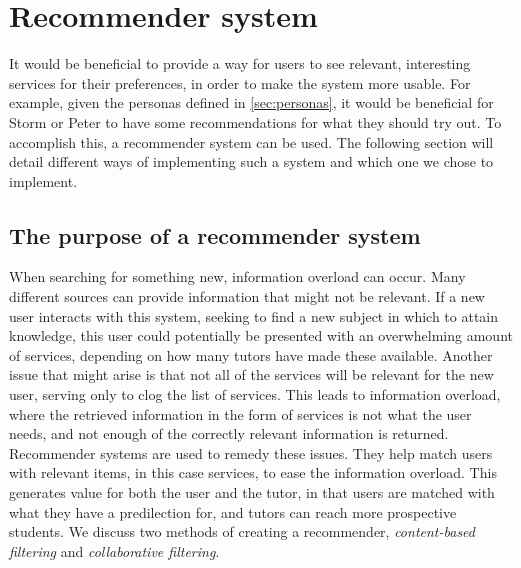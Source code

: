 \section{Recommender system}\label{Recommender-system}
It would be beneficial to provide a way for users to see relevant, interesting services for their preferences, in order to make the system more usable.
For example, given the personas defined in \autoref{sec:personas}, it would be beneficial for Storm or Peter to have some recommendations for what they should try out.
To accomplish this, a recommender system can be used.
The following section will detail different ways of implementing such a system and which one we chose to implement.

\subsection{The purpose of a recommender system}
When searching for something new, information overload can occur.
Many different sources can provide information that might not be relevant.
If a new user interacts with this system, seeking to find a new subject in which to attain knowledge, this user could potentially be presented with an overwhelming amount of services, depending on how many tutors have made these available.
Another issue that might arise is that not all of the services will be relevant for the new user, serving only to clog the list of services. 
This leads to information overload, where the retrieved information in the form of services is not what the user needs, and not enough of the correctly relevant information is returned.
Recommender systems are used to remedy these issues.
They help match users with relevant items, in this case services, to ease the information overload.
This generates value for both the user and the tutor, in that users are matched with what they have a predilection for, and tutors can reach more prospective students.
We discuss two methods of creating a recommender, \textit{content-based filtering} and \textit{collaborative filtering}.

